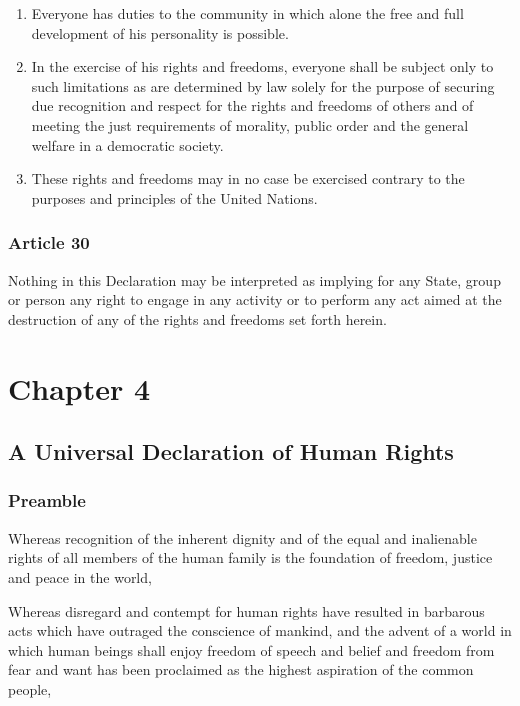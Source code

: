 \documentclass[
  titlepage,
  openright,
  DIV=calc,
  toc=listof,
  listof=nochaptergap]{scrbook}
\begin{document}
\begin{enumerate}
\def\labelenumi{\arabic{enumi}.}
\item
  Everyone has duties to the community in which alone the free and full
  development of his personality is possible.
\item
  In the exercise of his rights and freedoms, everyone shall be subject
  only to such limitations as are determined by law solely for the
  purpose of securing due recognition and respect for the rights and
  freedoms of others and of meeting the just requirements of morality,
  public order and the general welfare in a democratic society.
\item
  These rights and freedoms may in no case be exercised contrary to the
  purposes and principles of the United Nations.
\end{enumerate}

\subsection{Article 30}\label{article-30-2}

Nothing in this Declaration may be interpreted as implying for any
State, group or person any right to engage in any activity or to perform
any act aimed at the destruction of any of the rights and freedoms set
forth herein.

\chapter{Chapter 4}\label{sec:chapter4}

\section{A Universal Declaration of Human
Rights}\label{a-universal-declaration-of-human-rights-3}

\subsection{Preamble}\label{preamble-3}

Whereas recognition of the inherent dignity and of the equal and
inalienable rights of all members of the human family is the foundation
of freedom, justice and peace in the world,

Whereas disregard and contempt for human rights have resulted in
barbarous acts which have outraged the conscience of mankind, and the
advent of a world in which human beings shall enjoy freedom of speech
and belief and freedom from fear and want has been proclaimed as the
highest aspiration of the common people,
\end{document}
